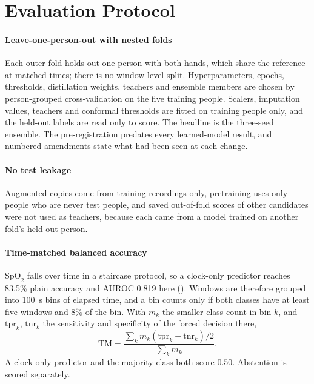 \documentclass[11pt,letterpaper]{article}
\newcommand{\spo}{\ensuremath{\mathrm{SpO}_2}}
\newcommand{\code}[1]{\texttt{\detokenize{#1}}}
\begin{document}
\section{Evaluation Protocol}\label{sec:protocol}
\paragraph{Leave-one-person-out with nested folds} Each outer fold holds out one person with both hands, which share the reference at matched times; there is no window-level split. Hyperparameters, epochs, thresholds, distillation weights, teachers and ensemble members are chosen by person-grouped cross-validation on the five training people. Scalers, imputation values, teachers and conformal thresholds are fitted on training people only, and the held-out labels are read only to score. The headline is the three-seed ensemble. The pre-registration predates every learned-model result, and numbered amendments state what had been seen at each change.

\paragraph{No test leakage} Augmented copies come from training recordings only, pretraining uses only people who are never test people, and saved out-of-fold scores of other candidates were not used as teachers, because each came from a model trained on another fold's held-out person.

\paragraph{Time-matched balanced accuracy} \spo{} falls over time in a staircase protocol, so a clock-only predictor reaches 83.5\% plain accuracy and AUROC 0.819 here (\code{results/table_a_main.csv}). Windows are therefore grouped into 100~s bins of elapsed time, and a bin counts only if both classes have at least five windows and 8\% of the bin. With $m_k$ the smaller class count in bin $k$, and $\mathrm{tpr}_k$, $\mathrm{tnr}_k$ the sensitivity and specificity of the forced decision there,
\begin{equation}
\mathrm{TM}=\frac{\sum_k m_k(\mathrm{tpr}_k+\mathrm{tnr}_k)/2}{\sum_k m_k}.
\end{equation}
A clock-only predictor and the majority class both score 0.50. Abstention is scored separately.
\end{document}

